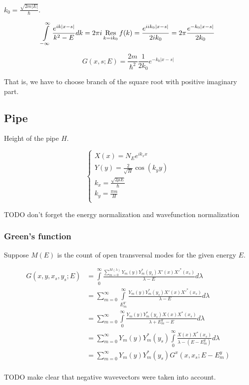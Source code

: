 \documentclass[12pt, a4paper]{article}
\def\res{\mathop{\operatorname{Res}}\limits}
\begin{document}
$k_0 = \frac{\sqrt{2m|E|}}{\hbar}$.


$$\int\limits_{-\infty}^\infty \frac{e^{ik|x -s|}}{k^2 - E} dk = 2 \pi i \res\limits_{k = i k_0} f(k) = \frac{e^{i i k_0 |x - s|}}{2 i k_0} = 2 \pi \frac{e^{-k_0 |x - s|}}{2 k_0}$$

$$G(x, s; E) = \frac{2m}{\hbar^2} \frac{1}{2 k_0} e^{-k_0 |x - s|}$$

That is, we have to choose branch of the square root with positive imaginary part.

\subsection{Pipe}

Height of the pipe $H$.

$$\begin{cases}
X(x) = N_E e^{i k_x x} \\
Y(y) = \frac{2}{\sqrt{H}} \cos(k_y y) \\
k_x = \frac{\sqrt{2 \mu E}}{\hbar} \\
k_y = \frac{\pi m}{H} \\
\end{cases}$$

TODO don't forget the energy normalization and wavefunction normalization

\subsubsection{Green's function}

Suppose $M(E)$ is the count of open transversal modes for the given energy $E$.

\begin{align*}
G(x, y, x_s, y_s; E)
&= \int\limits_{0}^{\infty} \frac{\sum\limits_{m = 0}^{M(\lambda)} Y_m(y) Y^*_m(y_s) X'(x) X'^*(x_s)  }{\lambda - E} d \lambda \\
&= \sum_{m = 0}^\infty \int\limits_{E^Y_m}^\infty \frac{Y_m(y) Y^*_m(y_s) X'(x) X'^*(x_s)}{\lambda - E} d\lambda \\
&= \sum_{m = 0}^\infty \int\limits_{0}^\infty \frac{Y_m(y) Y_m^*(y_s) X(x) X^*(x_s)}{\lambda + E^y_m - E} d\lambda \\
&= \sum_{m = 0}^\infty Y_m(y) Y^*_m(y_s) \int\limits_{0}^\infty \frac{X(x) X^*(x_s)}{\lambda - (E - E^y_m)} d\lambda \\
&= \sum_{m = 0}^\infty Y_m(y) Y^*_m(y_s) G^x(x, x_s; E - E^y_m) \\
\end{align*}

TODO make clear that negative wavevectors were taken into account.
\end{document}
